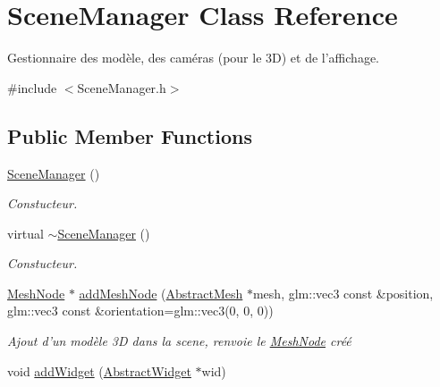 \hypertarget{classSceneManager}{\section{Scene\-Manager Class Reference}
\label{classSceneManager}
}


Gestionnaire des modèle, des caméras (pour le 3\-D) et de l'affichage.  




{\ttfamily \#include $<$Scene\-Manager.\-h$>$}

\subsection*{Public Member Functions}
\begin{DoxyCompactItemize}
\item 
\hypertarget{classSceneManager_a52085e6737c23b491c228e86781af808}{\hyperlink{classSceneManager_a52085e6737c23b491c228e86781af808}{Scene\-Manager} ()}\label{classSceneManager_a52085e6737c23b491c228e86781af808}

\begin{DoxyCompactList}\small\item\em Constucteur. \end{DoxyCompactList}\item 
\hypertarget{classSceneManager_a2bb376a85d29e85f47753e26c7539229}{virtual \hyperlink{classSceneManager_a2bb376a85d29e85f47753e26c7539229}{$\sim$\-Scene\-Manager} ()}\label{classSceneManager_a2bb376a85d29e85f47753e26c7539229}

\begin{DoxyCompactList}\small\item\em Constucteur. \end{DoxyCompactList}\item 
\hypertarget{classSceneManager_a28285bcb48151c06270333d39800d100}{\hyperlink{classMeshNode}{Mesh\-Node} $\ast$ \hyperlink{classSceneManager_a28285bcb48151c06270333d39800d100}{add\-Mesh\-Node} (\hyperlink{classAbstractMesh}{Abstract\-Mesh} $\ast$mesh, glm\-::vec3 const \&position, glm\-::vec3 const \&orientation=glm\-::vec3(0, 0, 0))}\label{classSceneManager_a28285bcb48151c06270333d39800d100}

\begin{DoxyCompactList}\small\item\em Ajout d'un modèle 3\-D dans la scene, renvoie le \hyperlink{classMeshNode}{Mesh\-Node} créé \end{DoxyCompactList}\item 
\hypertarget{classSceneManager_a0a09312366326529be7146f5825f703e}{void \hyperlink{classSceneManager_a0a09312366326529be7146f5825f703e}{add\-Widget} (\hyperlink{classAbstractWidget}{Abstract\-Widget} $\ast$wid)}\label{classSceneManager_a0a09312366326529be7146f5825f703e}


\end{DoxyCompactItemize}
